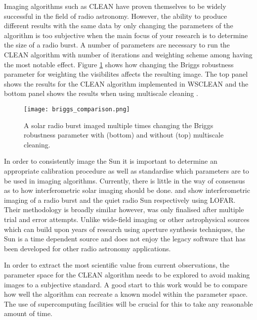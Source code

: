 Imaging algorithms such as CLEAN have proven themselves to be widely successful in the field of radio astronomy. However, the ability to produce different results with the same data by only changing the parameters of the algorithm is too subjective when the main focus of your research is to determine the size of a radio burst. A number of parameters are necessary to run the CLEAN algorithm with number of iterations and weighting scheme among having the most notable effect. Figure \ref{fig:briggs_comparison} shows how changing the Briggs robustness parameter for weighting the visibilites \citep{Briggs1995} affects the resulting image. The top panel shows the results for the CLEAN algorithm implemented in WSCLEAN and the bottom panel shows the results when using multiscale cleaning \citep{Offringa2017}. 

\begin{figure}[ht]
\centering
\texttt{[image: briggs\_comparison.png]}
\caption[An example of the same solar radio burst imaged with different weighting parameters.]{A solar radio burst imaged multiple times changing the Briggs robustness parameter with (bottom) and without (top) multiscale cleaning.}
\label{fig:briggs_comparison}
\end{figure}

In order to consistently image the Sun it is important to determine an appropriate calibration procedure as well as standardise which parameters are to be used in imaging algorithms. Currently, there is little in the way of consensus as to how interferometric solar imaging should be done. \cite{Maguire2021} and \cite{Ryan2021} show interferometric imaging of a radio burst and the quiet radio Sun respectively using LOFAR. Their methodology is broadly similar however, was only finalised after multiple trial and error attempts. Unlike wide-field imaging or other astrophysical sources which can build upon years of research using aperture synthesis techniques, the Sun is a time dependent source and does not enjoy the legacy software that has been developed for other radio astronomy applications. 

In order to extract the most scientific value from current observations, the parameter space for the CLEAN algorithm needs to be explored to avoid making images to a subjective standard. A good start to this work would be to compare how well the algorithm can recreate a known model within the parameter space. The use of supercomputing facilities will be crucial for this to take any reasonable amount of time. 



